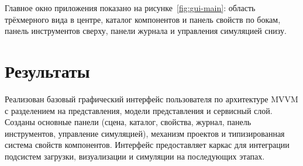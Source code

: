 Главное окно приложения показано на рисунке~\ref{fig:gui-main}: область
трёхмерного вида в центре, каталог компонентов и панель свойств по бокам,
панель инструментов сверху, панели журнала и управления симуляцией снизу.

\section{Результаты}

Реализован базовый графический интерфейс пользователя по архитектуре MVVM с
разделением на представления, модели представления и сервисный слой. Созданы
основные панели (сцена, каталог, свойства, журнал, панель инструментов,
управление симуляцией), механизм проектов и типизированная система свойств
компонентов. Интерфейс предоставляет каркас для интеграции подсистем загрузки,
визуализации и симуляции на последующих этапах.

